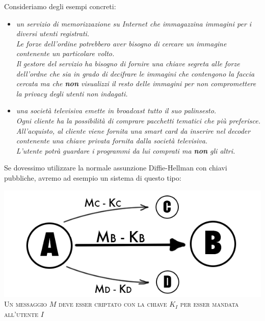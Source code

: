 Consideriamo degli esempi concreti:
\begin{itemize}
	\item {\itshape un servizio di memorizzazione su Internet che immagazzina immagini per i diversi utenti registrati.\\
Le forze dell'ordine potrebbero aver bisogno di cercare un immagine contenente un particolare volto.\\
Il gestore del servizio ha bisogno di fornire una chiave segreta alle forze dell'ordne che sia in grado di decifrare le immagini che contengono la faccia cercata ma che \textbf{non} visualizzi il resto delle immagini per non compromettere la privacy degli utenti non indagati.}
	\item {\itshape una società televisiva emette in broadcast tutto il suo palinsesto.\\
	Ogni cliente ha la possibilità di comprare \emph{pacchetti} tematici che più preferisce.\\
	All'acquisto, al cliente viene fornita una smart card da inserire nel decoder contenente una chiave privata fornita dalla società televisiva.\\
	L'utente potrà guardare i programmi da lui comprati ma \textbf{non} gli altri.}
\end{itemize}

\vspace{1cm}

Se dovessimo utilizzare la normale assunzione Diffie-Hellman con chiavi pubbliche, avremo ad esempio un sistema di questo tipo:

\begin{center}
\begin{minipage}[c]{0.9\textwidth}
		\centering
		\includegraphics[keepaspectratio,width=\textwidth]{keying.png}\\
		{\small\scshape Un messaggio $M$ deve esser criptato con la chiave $K_I$ per esser mandata all'utente $I$}
\end{minipage}
\end{center}
\vspace{0.4cm}

